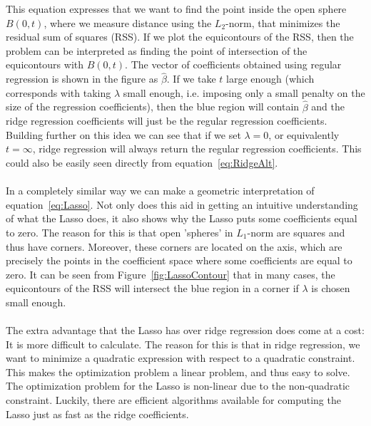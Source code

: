 This equation expresses that we want to find the point inside the open sphere $B(0,t)$, where we measure distance using the $L_2$-norm, that minimizes the residual sum of squares (RSS). If we plot the equicontours of the RSS, then the problem can be interpreted as finding the point of intersection of the equicontours with $B(0,t)$. The vector of coefficients obtained using regular regression is shown in the figure as $\hat{\beta}$. If we take $t$ large enough (which corresponds with taking $\lambda$ small enough, i.e. imposing only a small penalty on the size of the regression coefficients), then the blue region will contain $\hat{\beta}$ and the ridge regression coefficients will just be the regular regression coefficients. Building further on this idea we can see that if we set $\lambda = 0$, or equivalently $t = \infty$, ridge regression will always return the regular regression coefficients. This could also be easily seen directly from equation~\eqref{eq:RidgeAlt}.\\
\\
In a completely similar way we can make a geometric interpretation of equation~\eqref{eq:Lasso}. Not only does this aid in getting an intuitive understanding of what the Lasso does, it also shows why the Lasso puts some coefficients equal to zero. The reason for this is that open 'spheres' in $L_1$-norm are squares and thus have corners. Moreover, these corners are located on the axis, which are precisely the points in the coefficient space where some coefficients are equal to zero. It can be seen from Figure~\eqref{fig:LassoContour} that in many cases, the equicontours of the RSS will intersect the blue region in a corner if $\lambda$ is chosen small enough.\\
\\
The extra advantage that the Lasso has over ridge regression does come at a cost: It is more difficult to calculate. The reason for this is that in ridge regression, we want to minimize a quadratic expression with respect to a quadratic constraint. This makes the optimization problem a linear problem, and thus easy to solve. The optimization problem for the Lasso is non-linear due to the non-quadratic constraint. Luckily, there are efficient algorithms available for computing the Lasso just as fast as the ridge coefficients.

